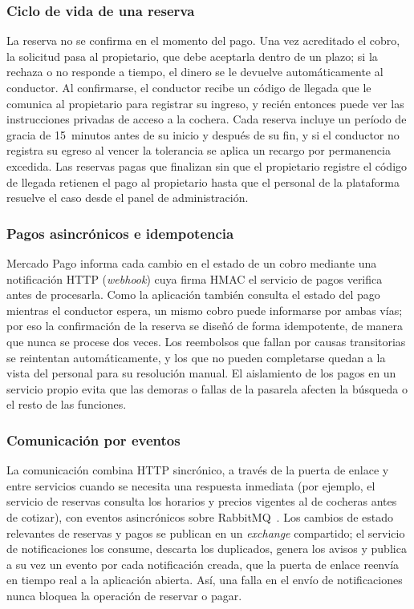 \documentclass[conference,a4paper]{IEEEtran}
\begin{document}
\subsubsection{Ciclo de vida de una reserva}
La reserva no se confirma en el momento del pago. Una vez acreditado el cobro, la solicitud pasa al propietario, que debe aceptarla dentro de un plazo; si la rechaza o no responde a tiempo, el dinero se le devuelve automáticamente al conductor. Al confirmarse, el conductor recibe un código de llegada que le comunica al propietario para registrar su ingreso, y recién entonces puede ver las instrucciones privadas de acceso a la cochera. Cada reserva incluye un período de gracia de 15~minutos antes de su inicio y después de su fin, y si el conductor no registra su egreso al vencer la tolerancia se aplica un recargo por permanencia excedida. Las reservas pagas que finalizan sin que el propietario registre el código de llegada retienen el pago al propietario hasta que el personal de la plataforma resuelve el caso desde el panel de administración.

\subsubsection{Pagos asincrónicos e idempotencia}
Mercado Pago informa cada cambio en el estado de un cobro mediante una notificación HTTP (\textit{webhook}) cuya firma HMAC el servicio de pagos verifica antes de procesarla. Como la aplicación también consulta el estado del pago mientras el conductor espera, un mismo cobro puede informarse por ambas vías; por eso la confirmación de la reserva se diseñó de forma idempotente, de manera que nunca se procese dos veces. Los reembolsos que fallan por causas transitorias se reintentan automáticamente, y los que no pueden completarse quedan a la vista del personal para su resolución manual. El aislamiento de los pagos en un servicio propio evita que las demoras o fallas de la pasarela afecten la búsqueda o el resto de las funciones.

\subsubsection{Comunicación por eventos}
La comunicación combina HTTP sincrónico, a través de la puerta de enlace y entre servicios cuando se necesita una respuesta inmediata (por ejemplo, el servicio de reservas consulta los horarios y precios vigentes al de cocheras antes de cotizar), con eventos asincrónicos sobre RabbitMQ~\cite{rabbitmq}. Los cambios de estado relevantes de reservas y pagos se publican en un \textit{exchange} compartido; el servicio de notificaciones los consume, descarta los duplicados, genera los avisos y publica a su vez un evento por cada notificación creada, que la puerta de enlace reenvía en tiempo real a la aplicación abierta. Así, una falla en el envío de notificaciones nunca bloquea la operación de reservar o pagar.
\end{document}
